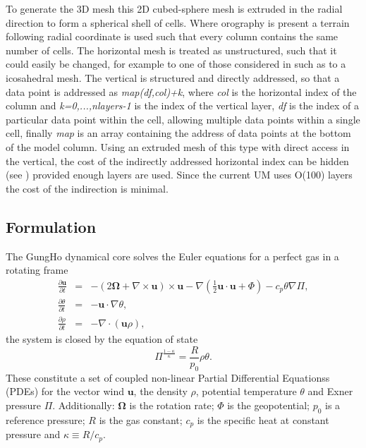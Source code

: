 \documentclass[review,times]{elsarticle}
\begin{document}
To generate the 3D mesh this 2D cubed-sphere mesh is extruded in the radial 
direction to form a spherical shell of cells. Where orography is present a terrain
following radial coordinate is used such that every column contains the
same number of cells. The horizontal mesh is treated as unstructured,
such that it could easily be changed, for example to one of those considered 
in \cite{staniforth2012} such as to a icosahedral mesh.
The vertical is structured and directly addressed, so that
a data point is addressed as \textit{map(df,col)+k}, where \textit{col}
is the horizontal index of the column and \textit{k=0,...,nlayers-1} is
the index of the vertical layer, \textit{df} is the index of a particular
data point within the cell, allowing multiple data points within a single cell, 
finally \textit{map} is an array containing the address of data points at 
the bottom of the model column.
Using an extruded mesh of this type with direct access in the vertical, the cost
of the indirectly addressed horizontal index can be hidden (see \cite{gmd-9-3803-2016})
provided enough layers are used. Since the current UM uses O(100) layers the 
cost of the indirection is minimal.
%

\subsection{Formulation\label{sec:sub:formulation}}
The GungHo dynamical core solves the Euler equations for a perfect gas in a 
rotating frame
%
\begin{eqnarray}
\frac{\partial\mathbf{u}}{\partial t} & = & -\left(2\bm{\Omega}+\nabla\times\mathbf{u}\right)\times\mathbf{u} - \nabla\left(\frac{1}{2}\mathbf{u}\cdot\mathbf{u} + \Phi\right) - c_p\theta\nabla\Pi,\label{eq:momentum}\\
\frac{\partial\theta}{\partial t} & = & - \mathbf{u}\cdot\nabla\theta,\label{eq:energy}\\
\frac{\partial\rho}{\partial t} & = & - \nabla\cdot\left(\mathbf{u}\rho\right)\label{eq:continuity},
\end{eqnarray}
%
the system is closed by the equation of state
%
\begin{equation}
\Pi^{\frac{1-\kappa}{\kappa}} = \frac{R}{p_0}\rho\theta.\label{eq:eos}
\end{equation}
%
These constitute a set of coupled non-linear Partial Differential
Equationss (PDEs) for the vector wind $\mathbf{u}$, 
the density $\rho$, potential temperature $\theta$ and Exner pressure $\Pi$. 
Additionally: $\bm{\Omega}$ is the rotation rate; $\Phi$ is the geopotential; 
$p_0$ is a reference pressure; $R$ is the gas constant; $c_p$ is the specific 
heat at constant pressure and $\kappa\equiv R/c_p$.
\end{document}
